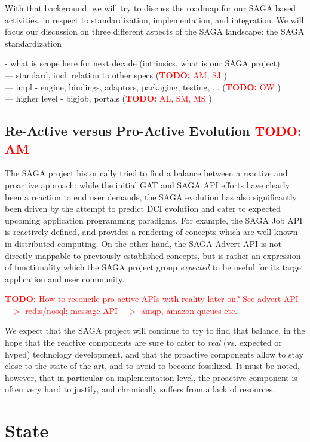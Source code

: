 \documentclass{article}
\newcommand{\I}[1]{\textit{#1}}
\newcommand{\B}[1]{\textbf{#1}}
\newcommand{\nind}{\noindent}
\newcommand{\todo}[1]{{\textcolor{red}{\B{TODO:} #1 }}}
\begin{document}
 With that background, we will try to discuss the roadmap for our SAGA
 based activities, in respect to standardization, implementation, and
 integration.  We will focus our discussion on three different aspects
 of the SAGA landscape: the SAGA standardization 

 \nind
 - what is scope here for next decade (intrinsics, what is our SAGA project)\\
 --- standard, incl. relation to other specs (\todo{AM, SJ} )\\
 --- impl - engine, bindings, adaptors, packaging, testing, ... (\todo{OW})\\
 --- higher level - bigjob, portals (\todo{AL, SM, MS})\\ 
      

 \subsection{Re-Active versus Pro-Active Evolution \todo{AM}}

  The SAGA project historically tried to find a balance between a
  reactive and proactive approach: while the initial GAT and SAGA API
  efforts have clearly been a reaction to end user demands, the SAGA
  evolution has also significantly been driven by the attempt to
  predict DCI evolution and cater to expected upcoming application
  programming paradigms.  For example, the SAGA Job API is reactively
  defined, and provides a rendering of concepts which are well known
  in distributed computing.  On the other hand, the SAGA Advert API is
  not directly mappable to previously established concepts, but is
  rather an expression of functionality which the SAGA project group
  \I{expected} to be useful for its target application and user
  community.

  \todo{How to reconcile pro-active APIs with reality later on?  See
  advert API $->$ redis/nosql; message API $->$ amqp, amazon queues
  etc.}
  
  We expect that the SAGA project will continue to try to find that
  balance, in the hope that the reactive components are sure to cater
  to \I{real} (vs. expected or hyped) technology development, and that
  the proactive components allow to stay close to the state of the
  art, and to avoid to become fossilized.  It must be noted, however,
  that in particular on implementation level, the proactive component
  is often very hard to justify, and chronically suffers from a lack
  of resources.


\section{State}
\end{document}
